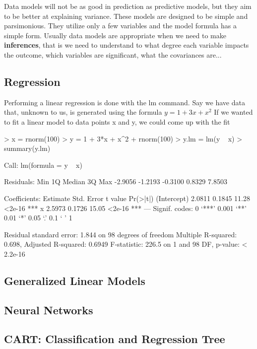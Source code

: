 \documentclass{article}
\begin{document}
Data models will not be as good in prediction as predictive models, but they
aim to be better at explaining variance.  These models are designed to be simple
and parsimonious.  They utilize only a few variables and the model formula
has a simple form.  Usually data models are appropriate when we need to make
\textbf{inferences}, that is we need to understand to what degree each variable
impacts the outcome, which variables are significant, what the covariances are...

\subsection{Regression}

Performing a linear regression is done with the lm command.  Say we have
data that, unknown to us, is generated using the formula $y = 1 + 3x + x^2$
If we wanted to fit a linear model to data points x and y, we could come
up with the fit

\begin{Schunk}
\begin{Sinput}
> x = rnorm(100)
> y = 1 + 3*x + x^2 + rnorm(100)
> y.lm = lm(y ~ x)
> summary(y.lm)
\end{Sinput}
\begin{Soutput}
Call:
lm(formula = y ~ x)

Residuals:
    Min      1Q  Median      3Q     Max 
-2.9056 -1.2193 -0.3100  0.8329  7.8503 

Coefficients:
            Estimate Std. Error t value Pr(>|t|)    
(Intercept)   2.0811     0.1845   11.28   <2e-16 ***
x             2.5973     0.1726   15.05   <2e-16 ***
---
Signif. codes:  0 ‘***’ 0.001 ‘**’ 0.01 ‘*’ 0.05 ‘.’ 0.1 ‘ ’ 1 

Residual standard error: 1.844 on 98 degrees of freedom
Multiple R-squared: 0.698,	Adjusted R-squared: 0.6949 
F-statistic: 226.5 on 1 and 98 DF,  p-value: < 2.2e-16 
\end{Soutput}
\end{Schunk}

\subsection{Generalized Linear Models}

\subsection{Neural Networks}

\subsection{CART: Classification and Regression Tree}
\end{document}
